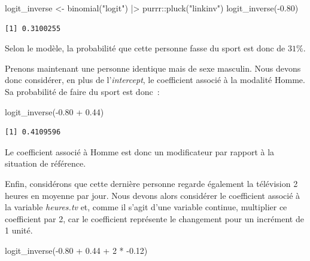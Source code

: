 \documentclass[
  letterpaper,
  DIV=11,
  numbers=noendperiod,
  oneside]{scrreprt}
\newenvironment{Shaded}{\begin{snugshade}}{\end{snugshade}}
\newcommand{\DecValTok}[1]{\textcolor[rgb]{0.68,0.00,0.00}{#1}}
\newcommand{\FloatTok}[1]{\textcolor[rgb]{0.68,0.00,0.00}{#1}}
\newcommand{\FunctionTok}[1]{\textcolor[rgb]{0.28,0.35,0.67}{#1}}
\newcommand{\NormalTok}[1]{\textcolor[rgb]{0.00,0.23,0.31}{#1}}
\newcommand{\OtherTok}[1]{\textcolor[rgb]{0.00,0.23,0.31}{#1}}
\newcommand{\SpecialCharTok}[1]{\textcolor[rgb]{0.37,0.37,0.37}{#1}}
\newcommand{\StringTok}[1]{\textcolor[rgb]{0.13,0.47,0.30}{#1}}
\begin{document}
\begin{Shaded}
\begin{Highlighting}[]
\NormalTok{logit\_inverse }\OtherTok{\textless{}{-}} \FunctionTok{binomial}\NormalTok{(}\StringTok{"logit"}\NormalTok{) }\SpecialCharTok{|\textgreater{}}\NormalTok{ purrr}\SpecialCharTok{::}\FunctionTok{pluck}\NormalTok{(}\StringTok{"linkinv"}\NormalTok{)}
\FunctionTok{logit\_inverse}\NormalTok{(}\SpecialCharTok{{-}}\FloatTok{0.80}\NormalTok{)}
\end{Highlighting}
\end{Shaded}

\begin{verbatim}
[1] 0.3100255
\end{verbatim}

Selon le modèle, la probabilité que cette personne fasse du sport est
donc de \(31\%\).

Prenons maintenant une personne identique mais de sexe masculin. Nous
devons donc considérer, en plus de l'\emph{intercept}, le coefficient
associé à la modalité Homme. Sa probabilité de faire du sport est donc~:

\begin{Shaded}
\begin{Highlighting}[]
\FunctionTok{logit\_inverse}\NormalTok{(}\SpecialCharTok{{-}}\FloatTok{0.80} \SpecialCharTok{+} \FloatTok{0.44}\NormalTok{)}
\end{Highlighting}
\end{Shaded}

\begin{verbatim}
[1] 0.4109596
\end{verbatim}

Le coefficient associé à Homme est donc un modificateur par rapport à la
situation de référence.

Enfin, considérons que cette dernière personne regarde également la
télévision 2 heures en moyenne par jour. Nous devons alors considérer le
coefficient associé à la variable \emph{heures.tv} et, comme il s'agit
d'une variable continue, multiplier ce coefficient par 2, car le
coefficient représente le changement pour un incrément de 1 unité.

\begin{Shaded}
\begin{Highlighting}[]
\FunctionTok{logit\_inverse}\NormalTok{(}\SpecialCharTok{{-}}\FloatTok{0.80} \SpecialCharTok{+} \FloatTok{0.44} \SpecialCharTok{+} \DecValTok{2} \SpecialCharTok{*} \SpecialCharTok{{-}}\FloatTok{0.12}\NormalTok{)}
\end{Highlighting}
\end{Shaded}
\end{document}
